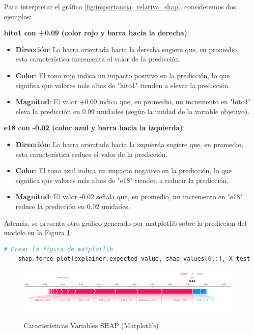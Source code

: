 Para interpretar el gráfico \ref{fig:importancia_relativa_shap}, consideremos dos ejemplos:

\textbf{hito1 con +0.09 (color rojo y barra hacia la derecha)}:
\begin{itemize}
    \item \textbf{Dirección}: La barra orientada hacia la derecha sugiere que, en promedio, esta característica incrementa el valor de la predicción.
    \item \textbf{Color}: El tono rojo indica un impacto positivo en la predicción, lo que significa que valores más altos de "hito1" tienden a elevar la predicción.
    \item \textbf{Magnitud}: El valor +0.09 indica que, en promedio, un incremento en "hito1" eleva la predicción en 0.09 unidades (según la unidad de la variable objetivo).
\end{itemize}

\textbf{e18 con -0.02 (color azul y barra hacia la izquierda)}:
\begin{itemize}
    \item \textbf{Dirección}: La barra orientada hacia la izquierda sugiere que, en promedio, esta característica reduce el valor de la predicción.
    \item \textbf{Color}: El tono azul indica un impacto negativo en la predicción, lo que significa que valores más altos de "e18" tienden a reducir la predicción.
    \item \textbf{Magnitud}: El valor -0.02 señala que, en promedio, un incremento en "e18" reduce la predicción en 0.02 unidades.
\end{itemize}


Además, se presenta otro gráfico generado por matplotlib sobre la prediccion del modelo en la Figura \ref{fig:caract_var_shap_mat}:

\begin{lstlisting}[language=Python, caption=grafico matplotib, label=lst:graf_matplotib]
    # Crear la figura de matplotlib
    shap.force_plot(explainer.expected_value, shap_values[0,:], X_test.iloc[0,:], matplotlib=True)
\end{lstlisting}

\begin{figure}[H]
    \centering
    \includegraphics[width=1\textwidth]{img/shap_rf/shapForcePlot.png}
    \caption{Características Variables SHAP (Matplotlib)}
    \label{fig:caract_var_shap_mat}
\end{figure}

